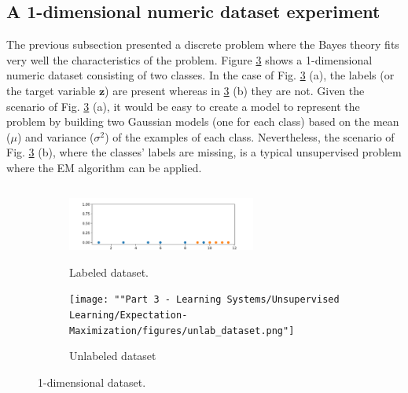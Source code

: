 
\subsection{A 1-dimensional numeric dataset experiment}

The previous subsection presented a discrete problem where the Bayes theory fits very well the characteristics of the problem. Figure \ref{fig:ds} shows a 1-dimensional numeric dataset consisting of two classes. In the case of Fig. \ref{fig:ds} (a), the labels (or the target variable $\mathbf{z}$) are present whereas in \ref{fig:ds} (b) they are not. Given the scenario of Fig. \ref{fig:ds} (a), it would be easy to create a model to represent the problem by building two Gaussian models (one for each class) based on the mean ($\mu$) and variance ($\sigma^{2}$) of the examples of each class. Nevertheless, the scenario of Fig. \ref{fig:ds} (b), where the classes' labels are missing, is a typical unsupervised problem where the EM algorithm can be applied. 

\begin{figure}
\centering
\begin{subfigure}{.5\textwidth}
  \centering
  \includegraphics[width=6.2cm,height=2.5cm]{"Part 3 - Learning Systems/Unsupervised Learning/Expectation-Maximization/figures/lab_dataset.png"}
  \caption{Labeled dataset.}
  \label{fig:lab_ds}
\end{subfigure}%
\begin{subfigure}{.5\textwidth}
  \centering
  \texttt{[image: ""Part 3 - Learning Systems/Unsupervised Learning/Expectation-Maximization/figures/unlab\_dataset.png"]}
  \caption{Unlabeled dataset}
  \label{fig:unlab_ds}
\end{subfigure}
\caption{1-dimensional dataset.}
\label{fig:ds}
\end{figure}

